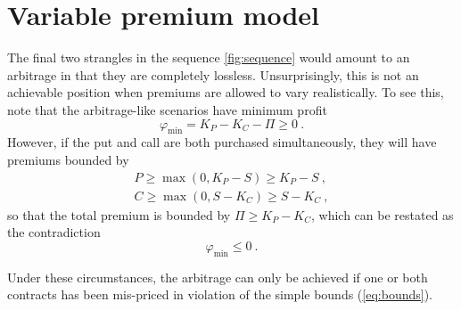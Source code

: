 \documentclass[aps,reprint]{revtex4-2}
\begin{document}
\section{Variable premium model}

The final two strangles in the sequence \ref{fig:sequence} would amount to an arbitrage in that they are completely lossless.  Unsurprisingly, this is not an achievable position when premiums are allowed to vary realistically.  To see this, note that the arbitrage-like scenarios have minimum profit
\begin{equation}
\varphi_{\min} = K_P - K_C - \Pi \geq 0~.
\end{equation}
However, if the put and call are both purchased simultaneously, they will have premiums bounded by 
\begin{subequations} \label{eq:bounds}
\begin{align}
P \geq \max(0, K_P - S) \geq K_P - S~,\\
C \geq \max(0, S - K_C) \geq S - K_C~,
\end{align}
\end{subequations}
so that the total premium is bounded by $\Pi \geq K_P - K_C$, which can be restated as the contradiction
\begin{equation}
\varphi_{\min} \leq 0~.
\end{equation}

Under these circumstances, the arbitrage can only be achieved if one or both contracts has been mis-priced in violation of the simple bounds (\ref{eq:bounds}).  
\end{document}
